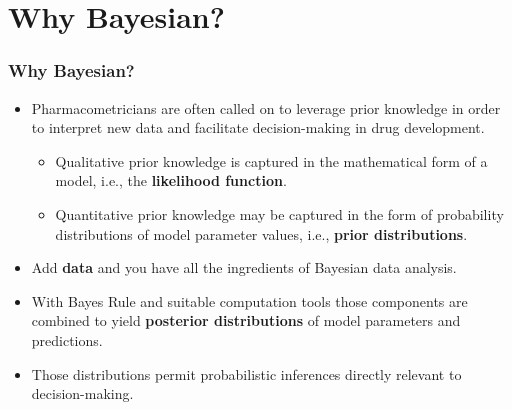 \documentclass{beamer}
\begin{document}
\section{Why Bayesian?}

\begin{frame}
  \frametitle{Why Bayesian?}

  \begin{itemize}
  \item<1-> Pharmacometricians are often called on to leverage prior knowledge
  in order to interpret new data and facilitate decision-making in
  drug development.
  \begin{itemize}
  \item<2-> Qualitative prior knowledge is captured in the mathematical
    form of a model, i.e., the \textcolor{mrggreen}{\bf likelihood function}.
  \item<3-> Quantitative prior knowledge may be captured in the form of
    probability distributions of model parameter values, i.e.,
    \textcolor{mrggreen}{\bf prior
    distributions}.
  \end{itemize}
  \item<4-> Add \textcolor{mrggreen}{\bf data} and you have all the ingredients of Bayesian data
    analysis.
\item<5-> With Bayes Rule and suitable computation tools those components
  are combined to yield \textcolor{mrggreen}{\bf posterior distributions} of model parameters
  and predictions.
\item<5-> Those distributions permit probabilistic inferences directly
  relevant to decision-making.
  \end{itemize}

\end{frame}

  
\end{document}

